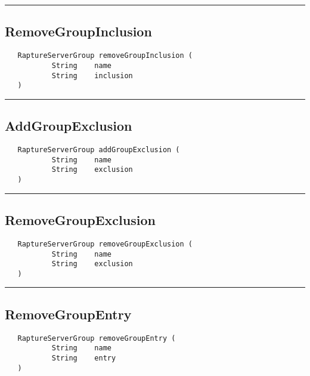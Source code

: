 \rule{15cm}{2pt}
\subsection{RemoveGroupInclusion}
\label{Api:RemoveGroupInclusion}
\begin{verbatim}
   RaptureServerGroup removeGroupInclusion (
           String    name
           String    inclusion
   )
\end{verbatim}



\rule{15cm}{2pt}
\subsection{AddGroupExclusion}
\label{Api:AddGroupExclusion}
\begin{verbatim}
   RaptureServerGroup addGroupExclusion (
           String    name
           String    exclusion
   )
\end{verbatim}



\rule{15cm}{2pt}
\subsection{RemoveGroupExclusion}
\label{Api:RemoveGroupExclusion}
\begin{verbatim}
   RaptureServerGroup removeGroupExclusion (
           String    name
           String    exclusion
   )
\end{verbatim}



\rule{15cm}{2pt}
\subsection{RemoveGroupEntry}
\label{Api:RemoveGroupEntry}
\begin{verbatim}
   RaptureServerGroup removeGroupEntry (
           String    name
           String    entry
   )
\end{verbatim}



